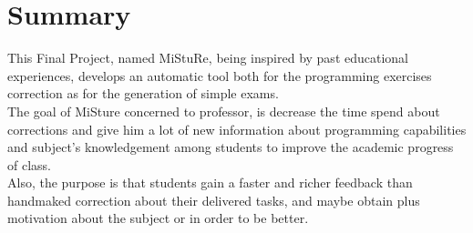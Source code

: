 

\chapter*{Summary}

This Final Project, named MiStuRe, being inspired by past educational experiences, develops an automatic tool both for the programming exercises correction as for the generation of simple exams.\\


The goal of MiSture concerned to professor, is decrease the time spend about corrections and give him a lot of new information about programming capabilities and subject's knowledgement among students to improve the academic progress of class.\\


Also, the purpose is that students gain a faster and richer feedback than handmaked correction about their delivered tasks, and maybe obtain plus motivation about the subject or in order to be better.\\

